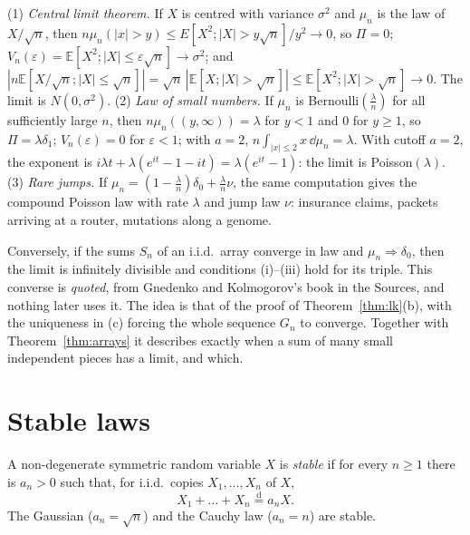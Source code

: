 \begin{example}\label{ex:threelimits}
(1) \emph{Central limit theorem.} If $X$ is centred with variance $\sigma^2$ and $\mu_n$ is the law of $X/\sqrt n$, then
$n\mu_n(|x|>y)\le E[X^2;|X|>y\sqrt n]/y^2\to0$, so $\Pi=0$; $V_n(\varepsilon)=\mathbb E[X^2;|X|\le\varepsilon\sqrt n]\to\sigma^2$; and
$|n\mathbb E[X/\sqrt n;|X|\le\sqrt n]|=\sqrt n\,|\mathbb E[X;|X|>\sqrt n]|\le\mathbb E[X^2;|X|>\sqrt n]\to0$. The limit is $N(0,\sigma^2)$.
(2) \emph{Law of small numbers.} If $\mu_n$ is Bernoulli$(\frac\lambda n)$ for all sufficiently large $n$, then $n\mu_n((y,\infty))=\lambda$ for $y<1$ and $0$ for $y\ge1$, so $\Pi=\lambda\delta_1$; $V_n(\varepsilon)=0$
for $\varepsilon<1$; with $a=2$, $n\int_{|x|\le2}x\,\dd\mu_n=\lambda$. With cutoff $a=2$, the exponent is $i\lambda t+\lambda(e^{it}-1-it)=\lambda(e^{it}-1)$: the limit is Poisson$(\lambda)$.
(3) \emph{Rare jumps.} If $\mu_n=(1-\frac\lambda n)\delta_0+\frac\lambda n\nu$, the same computation gives the compound Poisson law with rate $\lambda$ and jump law $\nu$:
insurance claims, packets arriving at a router, mutations along a genome.
\end{example}

\begin{remark}
Conversely, if the sums $S_n$ of an i.i.d.\ array converge in law and $\mu_n\Rightarrow\delta_0$, then the limit is infinitely divisible and conditions (i)--(iii)
hold for its triple. This converse is \emph{quoted}, from Gnedenko and Kolmogorov's book in the Sources, and nothing later uses it. The idea is that of the
proof of Theorem~\ref{thm:lk}(b), with the uniqueness in (c) forcing the whole sequence $G_n$ to converge. Together with Theorem~\ref{thm:arrays} it describes
exactly when a sum of many small independent pieces has a limit, and which.
\end{remark}

\section{Stable laws}

A non-degenerate symmetric random variable $X$ is \emph{stable} if for every $n\ge1$ there is $a_n>0$ such that, for i.i.d.\ copies $X_1,\dots,X_n$ of $X$,
\[
X_1+\dots+X_n\overset{\mathrm d}=a_nX.
\]
The Gaussian ($a_n=\sqrt n$) and the Cauchy law ($a_n=n$) are stable.

